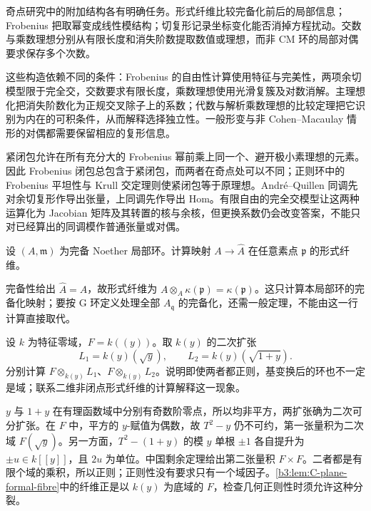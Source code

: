 







\begin{chaptersummary}
	奇点研究中的附加结构各有明确任务。形式纤维比较完备化前后的局部信息；Frobenius 把取幂变成线性模结构；切复形记录坐标变化能否消掉方程扰动。交数与乘数理想分别从有限长度和消失阶数提取数值或理想，而非 CM 环的局部对偶要求保存多个次数。

	\ProseParagraphBreak
	这些构造依赖不同的条件：Frobenius 的自由性计算使用特征与完美性，两项余切模型限于完全交，交数要求有限长度，乘数理想使用光滑复簇及对数消解。主理想化把消失阶数化为正规交叉除子上的系数；代数与解析乘数理想的比较定理把它识别为内在的可积条件，从而解释选择独立性。一般形变与非 Cohen--Macaulay 情形的对偶都需要保留相应的复形信息。

	\ProseParagraphBreak
	紧闭包允许在所有充分大的 Frobenius 幂前乘上同一个、避开极小素理想的元素。因此 Frobenius 闭包总包含于紧闭包，而两者在奇点处可以不同；正则环中的 Frobenius 平坦性与 Krull 交定理则使紧闭包等于原理想。André--Quillen 同调先对余切复形作导出张量，上同调先作导出 Hom。有限自由的完全交模型让这两种运算化为 Jacobian 矩阵及其转置的核与余核，但更换系数仍会改变答案，不能只对已经算出的同调模作普通张量或对偶。
\end{chaptersummary}

\BookExercises

\begin{exercise}\label{b3:ex:C-complete-formal-fibre}
	设 \((A,\mathfrak m)\) 为完备 Noether 局部环。计算映射 \(A\to\widehat A\) 在任意素点 \(\mathfrak p\) 的形式纤维。
\end{exercise}
\begin{solution}
	完备性给出 \(\widehat A=A\)，故形式纤维为 \(A\otimes_A\kappa(\mathfrak p)=\kappa(\mathfrak p)\)。这只计算本局部环的完备化映射；要按 G 环定义处理全部 \(A_{\mathfrak q}\) 的完备化，还需一般定理，不能由这一行计算直接取代。
\end{solution}

\begin{exercise}\label{b3:ex:C-plane-formal-fibre}
	设 \(k\) 为特征零域，\(F=k(\!(y)\!)\)。取 \(k(y)\) 的二次扩张
	\[
		L_1=k(y)(\sqrt y),\qquad L_2=k(y)(\sqrt{1+y}).
	\]
	分别计算 \(F\otimes_{k(y)}L_1\)、\(F\otimes_{k(y)}L_2\)。说明即使两者都正则，基变换后的环也不一定是域；联系二维非闭点形式纤维的计算解释这一现象。
\end{exercise}
\begin{solution}
	\(y\) 与 \(1+y\) 在有理函数域中分别有奇数阶零点，所以均非平方，两扩张确为二次可分扩张。在 \(F\) 中，平方的 \(y\)-赋值为偶数，故 \(T^2-y\) 仍不可约，第一张量积为二次域 \(F(\sqrt y)\)。另一方面，\(T^2-(1+y)\) 的模 \(y\) 单根 \(\pm1\) 各自提升为 \(\pm u\in k[\![y]\!]\)，且 \(2u\) 为单位。中国剩余定理给出第二张量积 \(F\times F\)。二者都是有限个域的乘积，所以正则；正则性没有要求只有一个域因子。\cref{b3:lem:C-plane-formal-fibre}中的纤维正是以 \(k(y)\) 为底域的 \(F\)，检查几何正则性时须允许这种分裂。
\end{solution}

